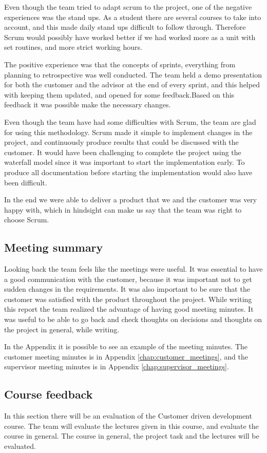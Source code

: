 Even though the team tried to adapt scrum to the project, one of the negative experiences was the stand ups. As a student there are several courses to take into account, and this made daily stand ups difficult to follow through. Therefore Scrum would possibly have worked better if we had worked more as a unit with set routines, and more strict working hours.

The positive experience was that the concepts of sprints, everything from planning to retrospective was well conducted. The team held a demo presentation for both the customer and the advisor at the end of every sprint, and this helped with keeping them updated, and opened for some feedback.Based on this feedback it was possible make the necessary changes.

Even though the team have had some difficulties with Scrum, the team are glad for using this methodology. Scrum made it simple to implement changes in the project, and continuously produce results that could  be discussed with the customer. It would have been challenging to complete the project using the waterfall model since it was important to start the implementation early. To produce all documentation before starting the implementation would also have been difficult. 

In the end we were able to deliver a product that we and the customer was very happy with, which in hindsight can make us say that the team was right to choose Scrum.

\subsection{Meeting summary}
Looking back the team feels like the meetings were useful. It was essential to have a good communication with the customer, because it was important not to get sudden changes in the requirements. It was also important to be sure that the customer was satisfied with the product throughout the project. While writing this report the team realized the advantage of having good meeting minutes. It was useful to be able to go back and check thoughts on decisions and thoughts on the project in general, while writing.

In the Appendix it is possible to see an example of the meeting minutes. The customer meeting minutes is in Appendix \ref{chap:customer_meetings}, and the supervisor meeting minutes is in Appendix \ref{chap:supervisor_meetings}. 
\subsection{Course feedback}
In this section there will be an evaluation of the Customer driven development course. The team will evaluate the lectures given in this course, and evaluate the course in general.
The course in general, the project task and the lectures will be evaluated.

